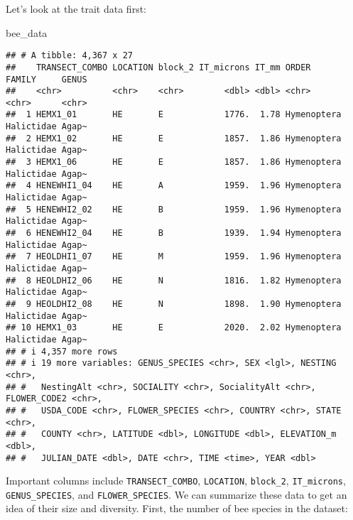 \documentclass[
]{article}
\newenvironment{Shaded}{\begin{snugshade}}{\end{snugshade}}
\newcommand{\FunctionTok}[1]{\textcolor[rgb]{0.13,0.29,0.53}{\textbf{#1}}}
\newcommand{\NormalTok}[1]{#1}
\newcommand{\SpecialCharTok}[1]{\textcolor[rgb]{0.81,0.36,0.00}{\textbf{#1}}}
\begin{document}
Let's look at the trait data first:

\begin{Shaded}
\begin{Highlighting}[]
\NormalTok{bee\_data}
\end{Highlighting}
\end{Shaded}

\begin{verbatim}
## # A tibble: 4,367 x 27
##    TRANSECT_COMBO LOCATION block_2 IT_microns IT_mm ORDER       FAMILY     GENUS
##    <chr>          <chr>    <chr>        <dbl> <dbl> <chr>       <chr>      <chr>
##  1 HEMX1_01       HE       E            1776.  1.78 Hymenoptera Halictidae Agap~
##  2 HEMX1_02       HE       E            1857.  1.86 Hymenoptera Halictidae Agap~
##  3 HEMX1_06       HE       E            1857.  1.86 Hymenoptera Halictidae Agap~
##  4 HENEWHI1_04    HE       A            1959.  1.96 Hymenoptera Halictidae Agap~
##  5 HENEWHI2_02    HE       B            1959.  1.96 Hymenoptera Halictidae Agap~
##  6 HENEWHI2_04    HE       B            1939.  1.94 Hymenoptera Halictidae Agap~
##  7 HEOLDHI1_07    HE       M            1959.  1.96 Hymenoptera Halictidae Agap~
##  8 HEOLDHI2_06    HE       N            1816.  1.82 Hymenoptera Halictidae Agap~
##  9 HEOLDHI2_08    HE       N            1898.  1.90 Hymenoptera Halictidae Agap~
## 10 HEMX1_03       HE       E            2020.  2.02 Hymenoptera Halictidae Agap~
## # i 4,357 more rows
## # i 19 more variables: GENUS_SPECIES <chr>, SEX <lgl>, NESTING <chr>,
## #   NestingAlt <chr>, SOCIALITY <chr>, SocialityAlt <chr>, FLOWER_CODE2 <chr>,
## #   USDA_CODE <chr>, FLOWER_SPECIES <chr>, COUNTRY <chr>, STATE <chr>,
## #   COUNTY <chr>, LATITUDE <dbl>, LONGITUDE <dbl>, ELEVATION_m <dbl>,
## #   JULIAN_DATE <dbl>, DATE <chr>, TIME <time>, YEAR <dbl>
\end{verbatim}

Important columns include \texttt{TRANSECT\_COMBO}, \texttt{LOCATION},
\texttt{block\_2}, \texttt{IT\_microns}, \texttt{GENUS\_SPECIES}, and
\texttt{FLOWER\_SPECIES}. We can summarize these data to get an idea of
their size and diversity. First, the number of bee species in the
dataset:

\begin{Shaded}
\end{Shaded}
\end{document}
